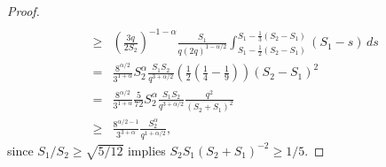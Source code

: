 \documentclass[a4paper,12pt,reqno]{amsart}
\theoremstyle{definition}
\theoremstyle{remark}
\begin{document}
\begin{proof}
\begin{eqnarray}
\nonumber\\
\nonumber%
&\ge&
\left(\frac {3q}{2S_2}\right)^{-1-\alpha}\frac{S_1}{ q (2q)^{1 - \alpha/2}}
\int_{S_1 -\frac 12(S_2-S_1)}^{S_1 -\frac 13(S_2-S_1)}
(S_1 - s) \, ds\\
&=&\nonumber
   \frac{8^{\alpha/2}}{3^{1+\alpha}}S_2^{\alpha}\frac{S_1S_2}{q^{3 + \alpha/2}}\left( \frac 12\left(\frac 14-\frac 19\right)\right)(S_2-S_1)^2\\
	&=&\nonumber
  \frac{8^{\alpha/2}}{3^{1+\alpha}}\frac5{72}S_2^{\alpha}\frac{S_1S_2}{q^{3 + \alpha/2}} \frac {q^2} {(S_2+S_1)^2}\\
&\ge&\nonumber
  \frac{8^{\alpha/2-1}}{3^{3+\alpha}} \frac{S_2^{\alpha}}{q^{1 + \alpha/2}},\end{eqnarray}
since $S_1/S_2\ge \sqrt{5/12}$ implies $S_2S_1 (S_2+S_1)^{-2} \ge 1/5$.
\end{proof}
\end{document}
